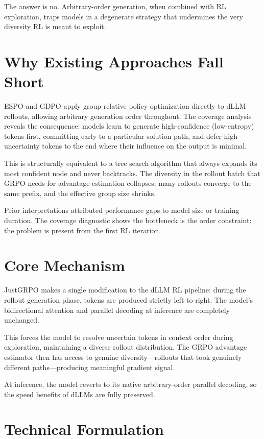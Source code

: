 \documentclass[10pt,twocolumn]{article}
\begin{document}
The answer is no. Arbitrary-order generation, when combined with RL exploration,
traps models in a degenerate strategy that undermines the very diversity RL is
meant to exploit.

\section{Why Existing Approaches Fall Short}

ESPO and GDPO apply group relative policy optimization directly to dLLM rollouts,
allowing arbitrary generation order throughout. The coverage analysis reveals
the consequence: models learn to generate high-confidence (low-entropy) tokens
first, committing early to a particular solution path, and defer high-uncertainty
tokens to the end where their influence on the output is minimal.

This is structurally equivalent to a tree search algorithm that always expands
its most confident node and never backtracks. The diversity in the rollout
batch that GRPO needs for advantage estimation collapses: many rollouts
converge to the same prefix, and the effective group size shrinks.

Prior interpretations attributed performance gaps to model size or training
duration. The coverage diagnostic shows the bottleneck is the order constraint:
the problem is present from the first RL iteration.

\section{Core Mechanism}

JustGRPO makes a single modification to the dLLM RL pipeline: during the
rollout generation phase, tokens are produced strictly left-to-right. The
model's bidirectional attention and parallel decoding at inference are
completely unchanged.

This forces the model to resolve uncertain tokens in context order during
exploration, maintaining a diverse rollout distribution. The GRPO advantage
estimator then has access to genuine diversity---rollouts that took genuinely
different paths---producing meaningful gradient signal.

At inference, the model reverts to its native arbitrary-order parallel decoding,
so the speed benefits of dLLMs are fully preserved.

\section{Technical Formulation}
\end{document}
